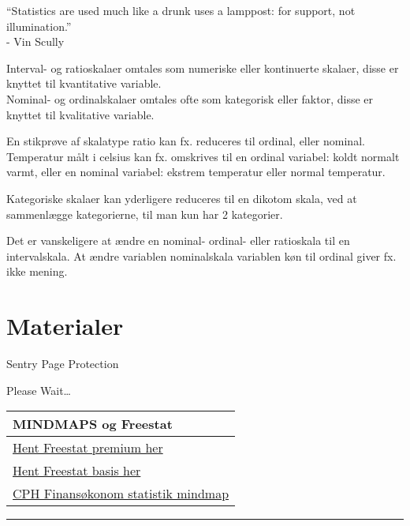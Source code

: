 \documentclass[]{book}
\begin{document}
``Statistics are used much like a drunk uses a lamppost: for support, not illumination.''\\
- Vin Scully

Interval- og ratioskalaer omtales som numeriske eller kontinuerte skalaer, disse er knyttet til kvantitative variable.\\
Nominal- og ordinalskalaer omtales ofte som kategorisk eller faktor, disse er knyttet til kvalitative variable.

En stikprøve af skalatype ratio kan fx. reduceres til ordinal, eller nominal. Temperatur målt i celsius kan fx. omskrives til en ordinal variabel: koldt normalt varmt, eller en nominal variabel: ekstrem temperatur eller normal temperatur.

Kategoriske skalaer kan yderligere reduceres til en dikotom skala, ved at sammenlægge kategorierne, til man kun har 2 kategorier.

Det er vanskeligere at ændre en nominal- ordinal- eller ratioskala til en intervalskala. At ændre variablen nominalskala variablen køn til ordinal giver fx. ikke mening.

\hypertarget{materialer}{%
\chapter{Materialer}\label{materialer}}

\hypertarget{Sentry_noJS}{}
Sentry Page Protection

\hypertarget{Sentry_redirecting}{}
Please Wait\ldots{}

\begin{longtable}[]{@{}l@{}}
\toprule
MINDMAPS og Freestat\tabularnewline
\midrule
\endhead
\href{https://www.dropbox.com/s/a2jztexbxfzcli0/FREESTAT.xlsx?dl=1}{Hent Freestat premium her}\tabularnewline
\href{https://www.dropbox.com/s/th8q95lf864npie/FREESTATfin.xlsx?dl=1}{Hent Freestat basis her}\tabularnewline
\href{https://drive.google.com/uc?export=download\&id=0B1E7VnhxsDMlQ1Zhdjh5WTJ4bnM}{CPH Finansøkonom statistik mindmap}\tabularnewline
\bottomrule
\end{longtable}

\begin{center}\rule{0.5\linewidth}{\linethickness}\end{center}
\end{document}
